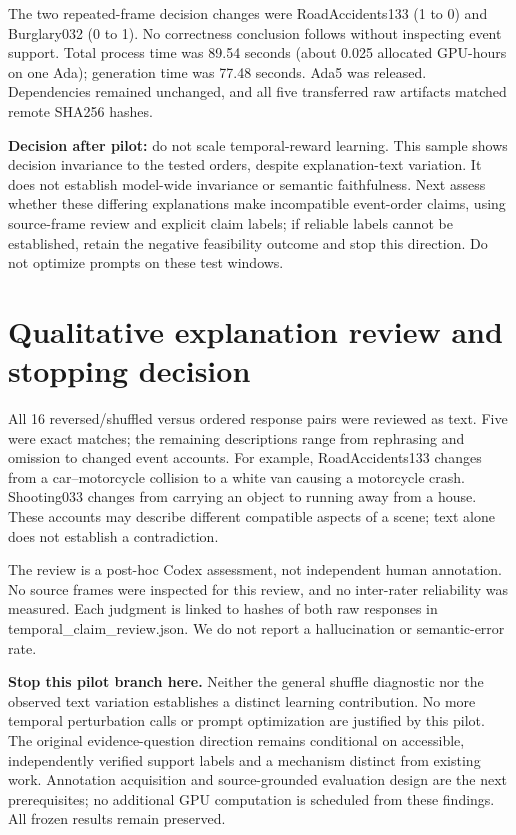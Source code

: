 \documentclass[11pt]{article}
\begin{document}
The two repeated-frame decision changes were RoadAccidents133 (1 to 0) and Burglary032 (0 to 1). No correctness conclusion follows without inspecting event support. Total process time was 89.54 seconds (about 0.025 allocated GPU-hours on one Ada); generation time was 77.48 seconds. Ada5 was released. Dependencies remained unchanged, and all five transferred raw artifacts matched remote SHA256 hashes.

\textbf{Decision after pilot:} do not scale temporal-reward learning. This sample shows decision invariance to the tested orders, despite explanation-text variation. It does not establish model-wide invariance or semantic faithfulness. Next assess whether these differing explanations make incompatible event-order claims, using source-frame review and explicit claim labels; if reliable labels cannot be established, retain the negative feasibility outcome and stop this direction. Do not optimize prompts on these test windows.


\section{Qualitative explanation review and stopping decision}
All 16 reversed/shuffled versus ordered response pairs were reviewed as text. Five were exact matches; the remaining descriptions range from rephrasing and omission to changed event accounts. For example, RoadAccidents133 changes from a car--motorcycle collision to a white van causing a motorcycle crash. Shooting033 changes from carrying an object to running away from a house. These accounts may describe different compatible aspects of a scene; text alone does not establish a contradiction.

The review is a post-hoc Codex assessment, not independent human annotation. No source frames were inspected for this review, and no inter-rater reliability was measured. Each judgment is linked to hashes of both raw responses in temporal\_claim\_review.json. We do not report a hallucination or semantic-error rate.

\textbf{Stop this pilot branch here.} Neither the general shuffle diagnostic nor the observed text variation establishes a distinct learning contribution. No more temporal perturbation calls or prompt optimization are justified by this pilot. The original evidence-question direction remains conditional on accessible, independently verified support labels and a mechanism distinct from existing work. Annotation acquisition and source-grounded evaluation design are the next prerequisites; no additional GPU computation is scheduled from these findings. All frozen results remain preserved.
\end{document}
